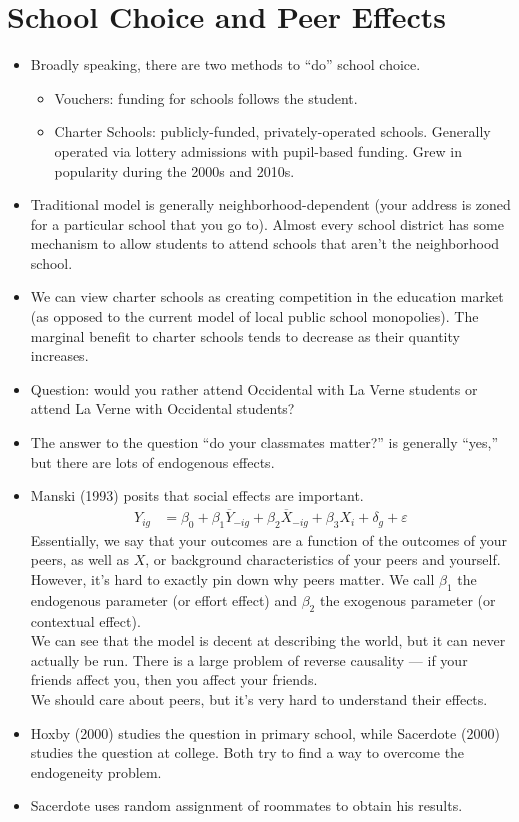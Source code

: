 \documentclass[10pt]{extarticle}
\begin{document}
  \section{School Choice and Peer Effects}%
  \begin{itemize}
    \item Broadly speaking, there are two methods to ``do'' school choice.
      \begin{itemize}
        \item Vouchers: funding for schools follows the student.
        \item Charter Schools: publicly-funded, privately-operated schools. Generally operated via lottery admissions with pupil-based funding. Grew in popularity during the 2000s and 2010s.
      \end{itemize}
    \item Traditional model is generally neighborhood-dependent (your address is zoned for a particular school that you go to). Almost every school district has some mechanism to allow students to attend schools that aren't the neighborhood school.
    \item We can view charter schools as creating competition in the education market (as opposed to the current model of local public school monopolies). The marginal benefit to charter schools tends to decrease as their quantity increases.
    \item Question: would you rather attend Occidental with La Verne students or attend La Verne with Occidental students?
    \item The answer to the question ``do your classmates matter?'' is generally ``yes,'' but there are lots of endogenous effects.
    \item Manski (1993) posits that social effects are important.
      \begin{align*}
        Y_{ig} &= \beta_0 + \beta_1 \overline{Y}_{-ig} + \beta_2\overline{X}_{-ig} + \beta_3X_i + \delta_g + \varepsilon
      \end{align*}
      Essentially, we say that your outcomes are a function of the outcomes of your peers, as well as $X$, or background characteristics of your peers and yourself.\\

      However, it's hard to exactly pin down why peers matter. We call $\beta_1$ the endogenous parameter (or effort effect) and $\beta_2$ the exogenous parameter (or contextual effect).\\

      We can see that the model is decent at describing the world, but it can never actually be run. There is a large problem of reverse causality --- if your friends affect you, then you affect your friends.\\

      We should care about peers, but it's very hard to understand their effects.
    \item Hoxby (2000) studies the question in primary school, while Sacerdote (2000) studies the question at college. Both try to find a way to overcome the endogeneity problem.
    \item Sacerdote uses random assignment of roommates to obtain his results.
  \end{itemize}
\end{document}
